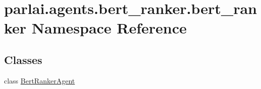 \hypertarget{namespaceparlai_1_1agents_1_1bert__ranker_1_1bert__ranker}{}\section{parlai.\+agents.\+bert\+\_\+ranker.\+bert\+\_\+ranker Namespace Reference}
\label{namespaceparlai_1_1agents_1_1bert__ranker_1_1bert__ranker}
\subsection*{Classes}
\begin{DoxyCompactItemize}
\item 
class \hyperlink{classparlai_1_1agents_1_1bert__ranker_1_1bert__ranker_1_1BertRankerAgent}{Bert\+Ranker\+Agent}
\end{DoxyCompactItemize}
